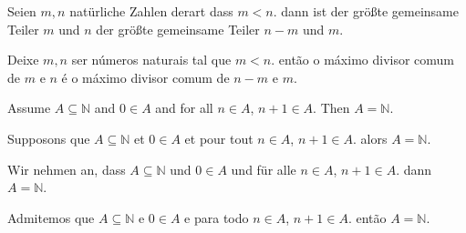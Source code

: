 \documentclass{article}
\begin{document}
Seien $ m, n $ natürliche Zahlen derart dass $ m < n $. dann ist der größte gemeinsame Teiler $ m $ und $ n $ der größte gemeinsame Teiler $ n-m $ und $ m $.

Deixe $ m, n $ ser números naturais tal que $ m < n $. então o máximo divisor comum de $ m $ e $ n $ é o máximo divisor comum de $ n-m $ e $ m $.


Assume $ A \subseteq \mathbb{N} $ and $ 0 \in A $ and for all $ n \in A $, $ n + 1 \in A $. Then $ A = \mathbb{N} $.

Supposons que $ A \subseteq \mathbb{N} $ et $ 0 \in A $ et pour tout $ n \in A $, $ n + 1 \in A $. alors $ A = \mathbb{N} $.

Wir nehmen an, dass $ A \subseteq \mathbb{N} $ und $ 0 \in A $ und für alle $ n \in A $, $ n + 1 \in A $. dann $ A = \mathbb{N} $.

Admitemos que $ A \subseteq \mathbb{N} $ e $ 0 \in A $ e para todo $ n \in A $, $ n + 1 \in A $. então $ A = \mathbb{N} $.
\end{document}

